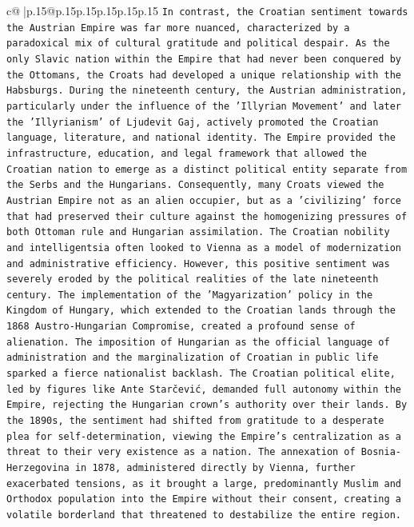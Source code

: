 \documentclass{article}
\begin{document}
{\begin{supertabular}{c@{$\;$}|p{.15\linewidth}@{}p{.15\linewidth}p{.15\linewidth}p{.15\linewidth}p{.15\linewidth}p{.15\linewidth}}
{{{\texttt{In contrast, the Croatian sentiment towards the Austrian Empire was far more nuanced, characterized by a paradoxical mix of cultural gratitude and political despair. As the only Slavic nation within the Empire that had never been conquered by the Ottomans, the Croats had developed a unique relationship with the Habsburgs. During the nineteenth century, the Austrian administration, particularly under the influence of the 'Illyrian Movement' and later the 'Illyrianism' of Ljudevit Gaj, actively promoted the Croatian language, literature, and national identity. The Empire provided the infrastructure, education, and legal framework that allowed the Croatian nation to emerge as a distinct political entity separate from the Serbs and the Hungarians. Consequently, many Croats viewed the Austrian Empire not as an alien occupier, but as a 'civilizing' force that had preserved their culture against the homogenizing pressures of both Ottoman rule and Hungarian assimilation. The Croatian nobility and intelligentsia often looked to Vienna as a model of modernization and administrative efficiency. However, this positive sentiment was severely eroded by the political realities of the late nineteenth century. The implementation of the 'Magyarization' policy in the Kingdom of Hungary, which extended to the Croatian lands through the 1868 Austro{-}Hungarian Compromise, created a profound sense of alienation. The imposition of Hungarian as the official language of administration and the marginalization of Croatian in public life sparked a fierce nationalist backlash. The Croatian political elite, led by figures like Ante Starčević, demanded full autonomy within the Empire, rejecting the Hungarian crown's authority over their lands. By the 1890s, the sentiment had shifted from gratitude to a desperate plea for self{-}determination, viewing the Empire's centralization as a threat to their very existence as a nation. The annexation of Bosnia{-}Herzegovina in 1878, administered directly by Vienna, further exacerbated tensions, as it brought a large, predominantly Muslim and Orthodox population into the Empire without their consent, creating a volatile borderland that threatened to destabilize the entire region.} \\
\\ 
}}}
\end{supertabular}}
\end{document}
